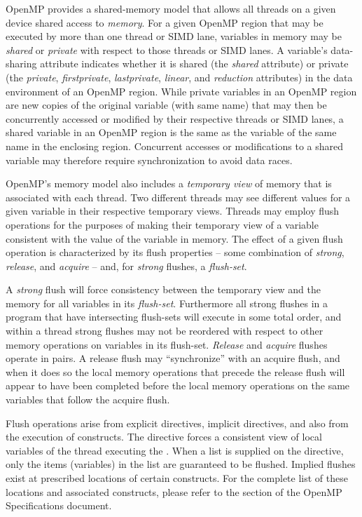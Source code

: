 \label{chap:memory_model}

OpenMP provides a shared-memory model that allows all threads on a given
device shared access to \emph{memory}. For a given OpenMP region that may be
executed by more than one thread or SIMD lane, variables in memory may be
\emph{shared} or \emph{private} with respect to those threads or SIMD lanes. A
variable's data-sharing attribute indicates whether it is shared (the
\emph{shared} attribute) or private (the \emph{private}, \emph{firstprivate},
\emph{lastprivate}, \emph{linear}, and \emph{reduction} attributes) in the data
environment of an OpenMP region. While private variables in an OpenMP region
are new copies of the original variable (with same name) that may then be
concurrently accessed or modified by their respective threads or SIMD lanes, a
shared variable in an OpenMP region is the same as the variable of the same
name in the enclosing region. Concurrent accesses or modifications to a
shared variable may therefore require synchronization to avoid data races.

OpenMP's memory model also includes a \emph{temporary view} of memory that is
associated with each thread. Two different threads may see different values for
a given variable in their respective temporary views. Threads may employ flush
operations for the purposes of making their temporary view of a variable
consistent with the value of the variable in memory. The effect of a given
flush operation is characterized by its flush properties -- some combination of
\emph{strong}, \emph{release}, and \emph{acquire} -- and, for \emph{strong}
flushes, a \emph{flush-set}. 

A \emph{strong} flush will force consistency between the temporary view and the
memory for all variables in its \emph{flush-set}.  Furthermore all strong flushes in a
program that have intersecting flush-sets will execute in some total order, and
within a thread strong flushes may not be reordered with respect to other
memory operations on variables in its flush-set. \emph{Release} and
\emph{acquire} flushes operate in pairs. A release flush may ``synchronize''
with an acquire flush, and when it does so the local memory operations that
precede the release flush will appear to have been completed before the local
memory operations on the same variables that follow the acquire flush.

Flush operations arise from explicit  directives, implicit
 directives, and also from the execution of 
constructs. The  directive forces a  consistent view of local
variables of the thread executing the .  When a list is supplied on
the directive, only the items (variables) in the list are guaranteed to be
flushed.  Implied flushes exist at prescribed locations of certain constructs.
For the complete list of these locations and associated constructs, please
refer to the  section of the OpenMP Specifications
document.

